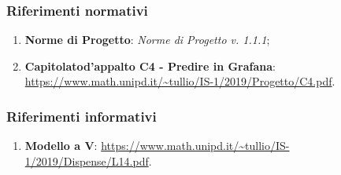 		\subsubsection{Riferimenti normativi}
		\begin{enumerate}
			\item \textbf{Norme di Progetto}: \textit{Norme di Progetto v. 1.1.1};
			\item \textbf{Capitolato}\glosp \textbf{d'appalto C4 - Predire in Grafana}\glo: \url{https://www.math.unipd.it/~tullio/IS-1/2019/Progetto/C4.pdf}.
		\end{enumerate}
	
		\subsubsection{Riferimenti informativi}
		\begin{enumerate}
		    \item \textbf{Modello a V}: \url{https://www.math.unipd.it/~tullio/IS-1/2019/Dispense/L14.pdf}.
		\end{enumerate}
	
	
	

	
	
	
	
